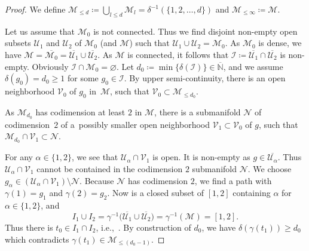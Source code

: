 \documentclass[pdftex]{sigma}
\newcommand\ceq{\coloneqq}
\newcommand\<{\langle}
\renewcommand\>{\rangle}
\newcommand{\NN}{\mathbb N}
\let\ol\overline
\newcommand{\maI}{\mathcal I}
\newcommand{\maM}{\mathcal M}
\newcommand{\maN}{\mathcal N}
\newcommand{\maU}{\mathcal U}
\newcommand{\maV}{\mathcal V}
\theoremstyle{definition}
\newcommand\ie{i.e.,\ \ignorespaces}
\newcommand\={\,=\,}
\numberwithin{equation}{section}
\begin{document}
\begin{proof}
We define $\maM_{\leq d}\ceq \bigcup_{l\leq d}\maM_l=\delta^{-1}(\{1,2,\ldots,d\})$ and $\maM_{\leq \infty}\ceq \maM$.

Let us assume that $\maM_0$ is not connected.
Thus we find disjoint non-empty open subsets $\maU_1$ and $\maU_2$ of $\maM_0$ (and $\maM$) such that $\maU_1\cup \maU_2=\maM_0$.
As $\maM_0$ is dense, we have $\maM=\overline{\maM_0}=\overline{\maU_1}\cup \overline{\maU_2}$.
As $\maM$ is connected, it follows that $\maI\ceq \overline{\maU_1}\cap \overline{\maU_2}$ is non-empty.
Obviously $\maI\cap \maM_0=\varnothing$. Let $d_0\ceq\min\{\delta(\maI)\}\in \overline{\NN}$, and we assume $\delta(g_0)=d_0\geq 1$ for some $g_0\in \maI$.
By upper semi-continuity, there is an open neighborhood $\maV_0$ of $g_0$ in~$\maM$, such that $\maV_0\subset \maM_{\leq d_0}$.

As $\maM_{d_0}$ has codimension at least $2$ in $\maM$, there is a submanifold $\maN$ of codimension~$2$ of a~possibly smaller open neighborhood $\maV_1\subset \maV_0$ of $g$, such that $\maM_{d_0}\cap \maV_1\subset \maN$.

For any $\alpha\in \{1,2\}$, we see that $\maU_\alpha\cap \maV_1$ is open. It is non-empty as $g\in \overline{\maU_\alpha}$.
Thus $\maU_\alpha\cap \maV_1$ cannot be contained in the codimension $2$ submanifold $\maN$.
We choose $g_\alpha\in (\maU_\alpha\cap \maV_1)\setminus \maN$. Because $\maN$ has codimension $2$, we find a path \smash{$\gamma\colon[1,2]\to \maV_1\setminus \maN\subset \maM_{\leq (d_0-1)}$} with $\gamma(1)=g_1$ and $\gamma(2)=g_2$. Now \smash{$I_\alpha\ceq \gamma^{-1}\bigl(\ol{\maU_\alpha}\bigr)$} is a closed subset of $[1,2]$ containing $\alpha$ for $\alpha\in\{1,2\}$, and
\[
I_1\cup I_2= \gamma^{-1}\bigl(\ol{\maU_1}\cup \ol{\maU_2}\bigr)= \gamma^{-1}(\maM)=[1,2].
\]
Thus there is $t_0\in I_1\cap I_2$, \ie \smash{$\gamma(t_1)\in \ol{\maU_1}\cap \ol{\maU_2}=\maI$}. By construction of $d_0$, we have $\delta(\gamma(t_1))\geq d_0$ which contradicts $\gamma(t_1)\in\maM_{\leq (d_0-1)}$.
\end{proof}
\end{document}
